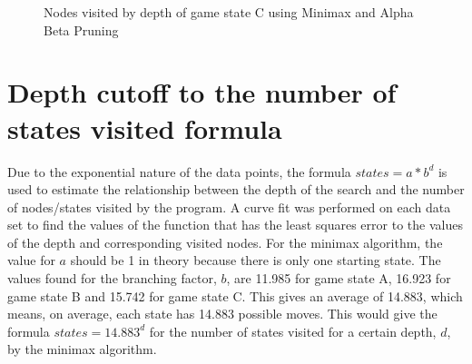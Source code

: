 \documentclass[11pt]{scrartcl}
\begin{document}
\begin{figure}[ht]
\centering
{}	
\caption{Nodes visited by depth of game state C using Minimax and Alpha Beta Pruning}
\end{figure}


\section{Depth cutoff to the number of states visited formula}

Due to the exponential nature of the data points, the formula $ states = a*b^d $ is used to estimate the relationship between the depth of the search and the number of nodes/states visited by the program. A curve fit was performed on each data set to find the values of the function that has the least squares error to the  values of the depth and corresponding visited nodes. For the minimax algorithm, the value for $a$ should be 1 in theory because there is only one starting state. The values found for the branching factor, $b$, are 11.985 for game state A, 16.923 for game state B and 15.742 for game state C. This gives an average of 14.883, which means, on average, each state has 14.883 possible moves. This would give the formula $ states = 14.883^d $ for the number of states visited for a certain depth, $d$, by the minimax algorithm.
\end{document}
